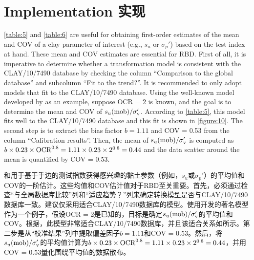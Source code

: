 \section{Implementation 实现}

\begin{paracol}{2}
    
    \autoref{table:5} and \autoref{table:6} are useful for obtaining first-order estimates of the mean and COV of a clay parameter of interest (e.g., $s_u$ or $\sigma_p'$) based on the test index at hand. These mean and COV estimates are essential for RBD. First of all, it is imperative to determine whether a transformation model is consistent with the CLAY/10/7490 database by checking the column “Comparison to the global database” and subcolumn “Fit to the trend?”. It is recommended to only adopt models that fit to the CLAY/10/7490 database. Using the well-known model developed by \citet{Jamiolkowski198557} as an example, suppose OCR = 2 is known, and the goal is to determine the mean and COV of $s_u(\rm{mob})/\sigma_v'$. According to \autoref{table:5}, this model fits well to the CLAY/10/7490 database and this fit is shown in \autoref{figure:10}. The second step is to extract the bias factor $b = 1.11$ and COV = 0.53 from the column “Calibration results”. Then, the mean of $s_u(\rm{mob})/\sigma_v'$ is computed as $b\times{}0.23\times{}\rm{OCR}^{0.8}=1.11\times{}0.23\times{}2^{0.8}=0.44$ and the data scatter around the mean is quantified by COV = 0.53.
        
    \switchcolumn
    
    和用于基于手边的测试指数获得感兴趣的黏土参数（例如，$s_u$或$\sigma_p'$）的平均值和COV的一阶估计。这些均值和COV估计值对于RBD至关重要。首先，必须通过检查“与全局数据库比较”列和“适应趋势？”列来确定转换模型是否与CLAY/10/7490数据库一致。建议仅采用适合CLAY/10/7490数据库的模型。使用\citet{Jamiolkowski198557}开发的著名模型作为一个例子，假设OCR = 2是已知的，目标是确定$s_u(\rm{mob})/\sigma_v'$的平均值和COV。根据，此模型非常适合CLAY/10/7490数据库，并且该适合关系如所示。第二步是从“校准结果”列中提取偏差因子$b = 1.11$和COV = 0.53。然后，将$s_u(\rm{mob})/\sigma_v'$的平均值计算为$b\times{}0.23\times{}\rm{OCR}^{0.8}=1.11\times{}0.23\times{}2^{0.8}=0.44$，并用COV = 0.53量化围绕平均值的数据散布。
        
    \switchcolumn*
    

\end{paracol}
